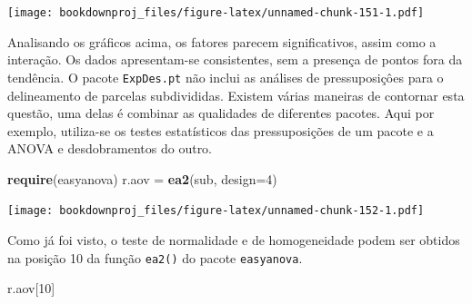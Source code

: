 \documentclass[
]{article}
\newenvironment{Shaded}{\begin{snugshade}}{\end{snugshade}}
\newcommand{\DataTypeTok}[1]{\textcolor[rgb]{0.13,0.29,0.53}{#1}}
\newcommand{\DecValTok}[1]{\textcolor[rgb]{0.00,0.00,0.81}{#1}}
\newcommand{\KeywordTok}[1]{\textcolor[rgb]{0.13,0.29,0.53}{\textbf{#1}}}
\newcommand{\NormalTok}[1]{#1}
\newcommand{\OperatorTok}[1]{\textcolor[rgb]{0.81,0.36,0.00}{\textbf{#1}}}
\newcommand{\StringTok}[1]{\textcolor[rgb]{0.31,0.60,0.02}{#1}}
\begin{document}
\begin{Shaded}
\end{Shaded}

\texttt{[image: bookdownproj\_files/figure-latex/unnamed-chunk-151-1.pdf]}

Analisando os gráficos acima, os fatores parecem significativos, assim como a interação. Os dados apresentam-se consistentes, sem a presença de pontos fora da tendência. O pacote \texttt{ExpDes.pt} não inclui as análises de pressuposiçôes para o delineamento de parcelas subdivididas. Existem várias maneiras de contornar esta questão, uma delas é combinar as qualidades de diferentes pacotes. Aqui por exemplo, utiliza-se os testes estatísticos das pressuposições de um pacote e a ANOVA e desdobramentos do outro.

\begin{Shaded}
\begin{Highlighting}[]
\KeywordTok{require}\NormalTok{(easyanova)}
\NormalTok{r.aov =}\StringTok{ }\KeywordTok{ea2}\NormalTok{(sub, }\DataTypeTok{design=}\DecValTok{4}\NormalTok{)}
\end{Highlighting}
\end{Shaded}

\texttt{[image: bookdownproj\_files/figure-latex/unnamed-chunk-152-1.pdf]}

Como já foi visto, o teste de normalidade e de homogeneidade podem ser obtidos na posição 10 da função \texttt{ea2()} do pacote \texttt{easyanova}.

\begin{Shaded}
\begin{Highlighting}[]
\NormalTok{r.aov[}\DecValTok{10}\NormalTok{]}
\end{Highlighting}
\end{Shaded}
\end{document}
